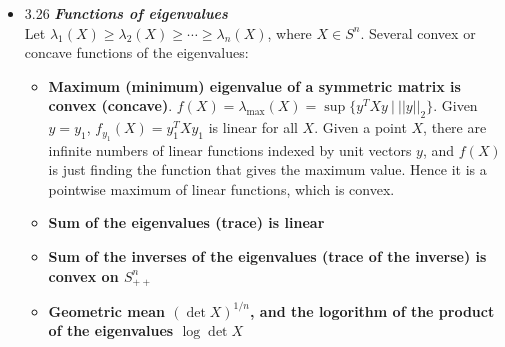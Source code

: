 \begin{itemize}
   \Proof \\ (a) Suppose  $C^+ = \{ i \ | \ p_i \ge q_i, \}$, $C^- = \{ i \ | \ p_i < q_i \}$, $i
\in 1,\cdots,n$.  Since $\prob(p,C^+) + \prob(p,C^-) = 1$, then $\prob(p,C^+) + \prob(q,C^+) =
1-\prob(p,C^-) - (1-\prob(q,C^-)) = -(\prob(p,C^-) - \prob(q,C^-))$ $d_{mp}(p,q) = ||p-q||_1^{C^+} =
\sum_{i\in C^+} |p_i-q_i|$ $\blacksquare$ \\
   
   (b) Since $||p-q||_1^{C^+} = \sum_{i\in C^+} |p_i - q_i| = 1^Tp - 1^Tq$ is a linear function of
the domain, hence convex.  To make it even more simplified, notice that since $\sum_{i\in C^+} (p_i
- q_i) = -\sum_{i\in C^-} (p_i - q_i)$, then $d_{mp}(p,q) = 1/2 \sum_{i\in C^+} (p_i - q_i) +
  1/2\sum_{i\in C^+} (p_i - q_i) = 1/2\sum_{i\in C^+} (p_i - q_i) - 1/2 \sum_{i\in C^-} (p_i - q_i)
= 1/2\sum_{i\in C^+} (p_i - q_i) + 1/2 \sum_{i\in C^-} (q_i - p_i) = 1/2\sum_i |p_i - q_i| =
1/2||p-q||_1$.  {\bf\emph{Maximum probability distance between distributions is $1/2||p-q||_1$}}
$\blacksquare$ 




\item 3.26 {\bf\emph{Functions of eigenvalues}} \\ Let $\lambda_1(X) \ge \lambda_2(X) \ge \cdots \ge
\lambda_n(X)$, where $X \in S^n$.  Several convex or concave functions of the eigenvalues:
\begin{itemize} \item {\bf{Maximum (minimum) eigenvalue of a symmetric matrix is convex (concave)}}.
$f(X) = \lambda_{\max}(X) = \sup \{ y^T X y \ | \ ||y||_2 \}$.  Given $y=y_1$, $f_{y_1}(X) =
y_1^TXy_1$ is linear for all $X$.  Given a point $X$, there are infinite numbers of linear functions
indexed by unit vectors $y$, and $f(X)$ is just finding the function that gives the maximum value.
Hence it is a pointwise maximum of linear functions, which is convex.  \item {\bf{Sum of the
eigenvalues (trace) is linear}}  \item {\bf{Sum of the inverses of the eigenvalues (trace of the
inverse) is convex on $S_{++}^n$}} \item {\bf{Geometric mean $(\det X)^{1/n}$, and the logorithm of
the product of the eigenvalues $\log\det X$}} \end{itemize} 
   


























\end{itemize}

%
